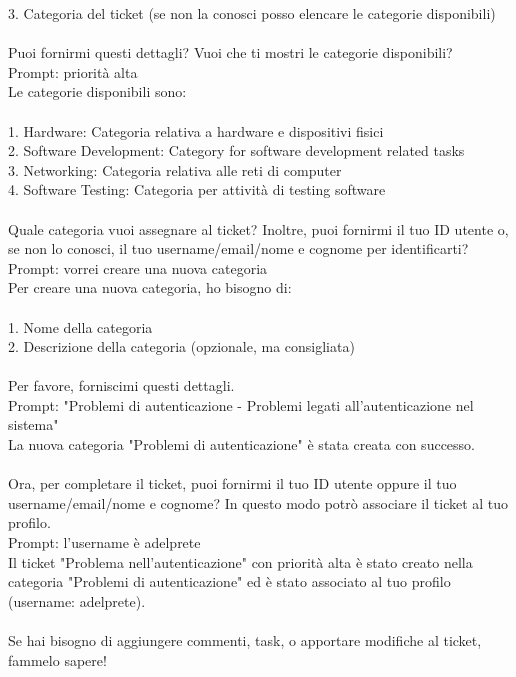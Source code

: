 \begin{windowsconsole}
3. Categoria del ticket (se non la conosci posso elencare le categorie disponibili)\\
\\
Puoi fornirmi questi dettagli? Vuoi che ti mostri le categorie disponibili?\\
Prompt: priorità alta\\
Le categorie disponibili sono:\\
\\
1. Hardware: Categoria relativa a hardware e dispositivi fisici\\
2. Software Development: Category for software development related tasks\\
3. Networking: Categoria relativa alle reti di computer\\
4. Software Testing: Categoria per attività di testing software\\
\\
Quale categoria vuoi assegnare al ticket? Inoltre, puoi fornirmi il tuo ID utente o, se non lo conosci, il tuo username/email/nome e cognome per identificarti?\\
Prompt: vorrei creare una nuova categoria\\
Per creare una nuova categoria, ho bisogno di:\\
\\
1. Nome della categoria\\
2. Descrizione della categoria (opzionale, ma consigliata)\\
\\
Per favore, forniscimi questi dettagli.\\
Prompt: "Problemi di autenticazione - Problemi legati all'autenticazione nel sistema"\\
La nuova categoria "Problemi di autenticazione" è stata creata con successo.\\
\\
Ora, per completare il ticket, puoi fornirmi il tuo ID utente oppure il tuo username/email/nome e cognome? In questo modo potrò associare il ticket al tuo profilo.\\
Prompt: l'username è adelprete\\
Il ticket "Problema nell'autenticazione" con priorità alta è stato creato nella categoria "Problemi di autenticazione" ed è stato associato al tuo profilo (username: adelprete).\\
\\
Se hai bisogno di aggiungere commenti, task, o apportare modifiche al ticket, fammelo sapere!\\
\end{windowsconsole}